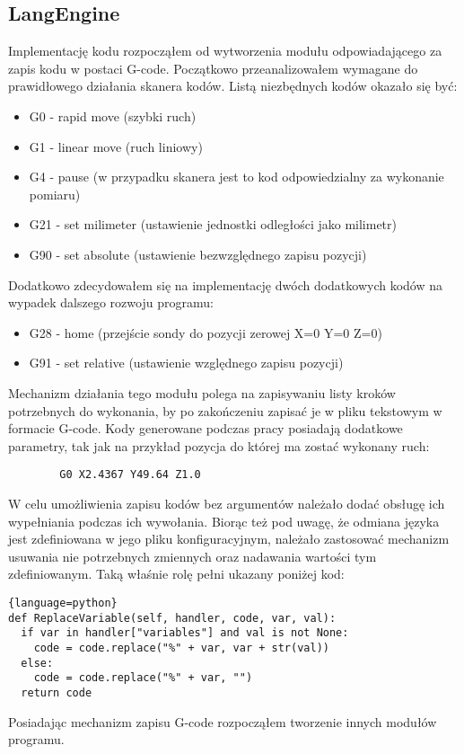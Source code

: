 \documentclass[a4paper,12pt,twoside,openany]{report}
\begin{document}
    \subsection{LangEngine}
      Implementację kodu rozpocząłem od wytworzenia modułu odpowiadającego za zapis kodu w postaci G-code. 
      Początkowo przeanalizowałem wymagane do prawidłowego działania skanera kodów. Listą niezbędnych kodów 
      okazało się być:
      \begin{itemize}
        \item G0 - rapid move (szybki ruch)
        \item G1 - linear move (ruch liniowy)
        \item G4 - pause (w przypadku skanera jest to kod odpowiedzialny za wykonanie pomiaru)
        \item G21 - set milimeter (ustawienie jednostki odległości jako milimetr)
        \item G90 - set absolute (ustawienie bezwzględnego zapisu pozycji)
      \end{itemize}
      Dodatkowo zdecydowałem się na implementację dwóch dodatkowych kodów na wypadek dalszego rozwoju programu:
      \begin{itemize}
        \item G28 - home (przejście sondy do pozycji zerowej X=0 Y=0 Z=0)
        \item G91 - set relative (ustawienie względnego zapisu pozycji)
      \end{itemize}
      Mechanizm działania tego modułu polega na zapisywaniu listy kroków potrzebnych do wykonania, by po zakończeniu 
      zapisać je w pliku tekstowym w formacie G-code. Kody generowane podczas pracy posiadają dodatkowe parametry, 
      tak jak na przykład pozycja do której ma zostać wykonany ruch:
      \begin{lstlisting}
        G0 X2.4367 Y49.64 Z1.0
      \end{lstlisting}
      W celu umożliwienia zapisu kodów bez argumentów należało dodać obsługę ich wypełniania podczas ich wywołania. 
      Biorąc też pod uwagę, że odmiana języka jest zdefiniowana w jego pliku konfiguracyjnym, należało zastosować 
      mechanizm usuwania nie potrzebnych zmiennych oraz nadawania wartości tym zdefiniowanym. Taką właśnie rolę 
      pełni ukazany poniżej kod:
      \noindent
      \begin{lstlisting}{language=python}
def ReplaceVariable(self, handler, code, var, val):
  if var in handler["variables"] and val is not None:
    code = code.replace("%" + var, var + str(val))
  else:
    code = code.replace("%" + var, "")
  return code
      \end{lstlisting}
      Posiadając mechanizm zapisu G-code rozpocząłem tworzenie innych modułów programu.
    
\end{document}
